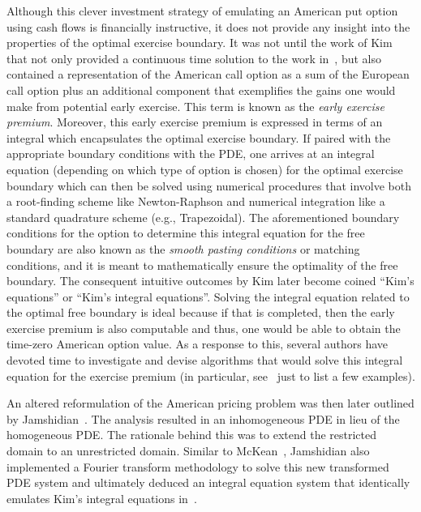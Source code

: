 Although this clever investment strategy of emulating an American put option using cash flows is financially instructive, it does not provide any insight into the properties of the optimal exercise boundary. It was not until the work of Kim~\cite{Kim1990} that not only provided a continuous time solution to the work in~\cite{Geske1984}, but also contained a representation of the American call option as a sum of the European call option plus an additional component that exemplifies the gains one would make from potential early exercise. This term is known as the \emph{early exercise premium}. Moreover, this early exercise premium is expressed in terms of an integral which encapsulates the optimal exercise boundary. If paired with the appropriate boundary conditions with the PDE, one arrives at an integral equation (depending on which type of option is chosen) for the optimal exercise boundary which can then be solved using numerical procedures that involve both a root-finding scheme like Newton-Raphson and numerical integration like a standard quadrature scheme (e.g., Trapezoidal). The aforementioned boundary conditions for the option to determine this integral equation for the free boundary are also known as the \emph{smooth pasting conditions} or matching conditions, and it is meant to mathematically ensure the optimality of the free boundary. The consequent intuitive outcomes by Kim later become coined ``Kim's equations'' or ``Kim's integral equations''. Solving the integral equation related to the optimal free boundary is ideal because if that is completed, then the early exercise premium is also computable and thus, one would be able to obtain the time-zero American option value. As a response to this, several authors have devoted time to investigate and devise algorithms that would solve this integral equation for the exercise premium (in particular, see~\cite{Huang1996, Press1992, Sevcovic2001} just to list a few examples). 

An altered reformulation of the American pricing problem was then later outlined by Jamshidian~\cite{Jamshidian1992}. The analysis resulted in an inhomogeneous PDE in lieu of the homogeneous PDE. The rationale behind this was to extend the restricted domain to an unrestricted domain. Similar to McKean~\cite{McKean1965}, Jamshidian also implemented a Fourier transform methodology to solve this new transformed PDE system and ultimately deduced an integral equation system that identically emulates Kim's integral equations in~\cite{Kim1990}.

